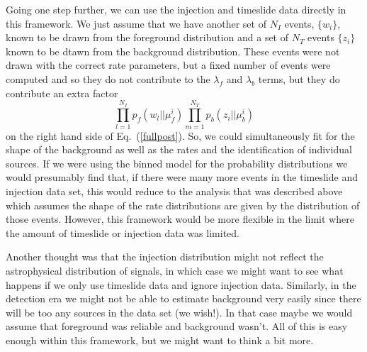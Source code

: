 \documentclass[prd,aps,eqsecnum]{revtex4}
\def\be{\begin{equation}}
\def\ee{\end{equation}}
\begin{document}
Going one step further, we can use the injection and timeslide data directly in this framework. We just assume that we have another set of $N_I$ events, $\{ w_i \}$, known to be drawn from the foreground distribution and a set of $N_T$ events $\{z_i\}$ known to be dtawn from the background distribution. These events were not drawn with the correct rate parameters, but a fixed number of events were computed and so they do not contribute to the $\lambda_f$ and $\lambda_b$ terms, but they do contribute an extra factor
\be
\prod_{l=1}^{N_I} p_f(w_l | | \mu_f^i) \prod_{m=1}^{N_T} p_b(z_i | | \mu_b^i) 
\ee
on the right hand side of Eq.~(\ref{fullpost}). So, we could simultaneously fit for the shape of the background as well as the rates and the identification of individual sources. If we were using the binned model for the probability distributions we would presumably find that, if there were many more events in the timeslide and injection data set, this would reduce to the analysis that was described above which assumes the shape of the rate distributions are given by the distribution of those events. However, this framework would be more flexible in the limit where the amount of timeslide or injection data was limited.

Another thought was that the injection distribution might not reflect the astrophysical distribution of signals, in which case we might want to see what happens if we only use timeslide data and ignore injection data. Similarly, in the detection era we might not be able to estimate background very easily since there will be too any sources in the data set (we wish!). In that case maybe we would assume that foreground was reliable and background wasn't. All of this is easy enough within this framework, but we might want to think a bit more.
\end{document}
